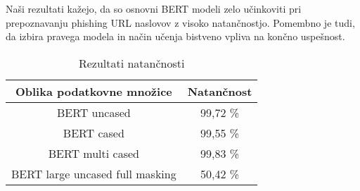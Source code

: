 \documentclass[sigconf,nonacm]{acmart}
\begin{document}
Naši rezultati kažejo, da so osnovni BERT modeli zelo učinkoviti pri prepoznavanju phishing URL naslovov z visoko natančnostjo. Pomembno je tudi, da izbira pravega modela in način učenja bistveno vpliva na končno uspešnost.

\begin{table}
    \centering
    \caption{Rezultati natančnosti}
    \label{tab:table2}
    \begin{tabular}{cc}
        	\toprule
        	Oblika podatkovne množice&Natančnost\\
       	 \midrule
        	BERT uncased & 99,72 \% \\
       	BERT cased &  99,55 \%  \\
	BERT multi cased & 99,83 \% \\
	BERT large uncased full masking  &  50,42 \% \\
       	 \bottomrule
    \end{tabular}
\end{table}



\end{document}
